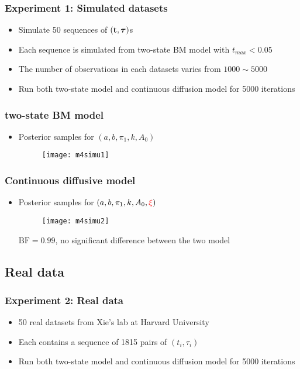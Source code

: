 \documentclass[11pt]{beamer}
\newcommand{\bit}{\begin{itemize}\setlength{\itemsep}{0cm}\setlength{\topsep}{0cm}}
\newcommand{\eit}{\end{itemize}}
\newcommand{\btau}{{\boldsymbol{\tau}}}
\newcommand{\bt}{{\bf t}}
\begin{document}
\begin{frame}
\frametitle{Experiment 1: Simulated datasets}
\bit
\item Simulate {\color{red}50} sequences of $(\bt,\btau)$s 
\item Each sequence is simulated from {\color{red} two-state BM model} with $t_{max}<0.05$
\item The number of observations in each datasets varies from $1000\sim 5000$
\item Run both two-state model and continuous diffusion model for 5000 iterations
\eit
\end{frame}


\begin{frame}
\frametitle{two-state BM model}
\bit
\item Posterior samples for $(a,b,\pi_1,k,A_0)$
	\begin{figure}
		\centering
		\texttt{[image: m4simu1]}
	\end{figure}
\eit
\end{frame}


\begin{frame}
	\frametitle{Continuous diffusive model}
	\bit
	\item Posterior samples for $(a,b,\pi_1,k,A_0,{ \color{red}\xi})$
	\begin{figure}
		\centering
		\texttt{[image: m4simu2]}
	\end{figure}
$\mbox{BF} = 0.99$, no significant difference between the two model
\eit
\end{frame}
\subsection{Real data}
\begin{frame}
\frametitle{Experiment 2: Real data}
\bit
\item 50 real datasets from Xie's lab at Harvard University 
\item Each contains a sequence of 1815 pairs of $(t_i,\tau_i)$
\item Run both two-state model and continuous diffusion model for 5000 iterations
\eit
\end{frame}
\end{document}
